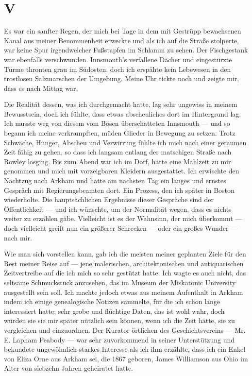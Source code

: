 \chapter*{V}

Es war ein sanfter Regen, der mich bei Tage in dem mit Gestrüpp bewachsenen Kanal aus meiner Benommenheit erweckte und als ich auf die Straße stolperte, war keine Spur irgendwelcher Fußstapfen im Schlamm zu sehen. Der Fischgestank war ebenfalls verschwunden. Innsmouth's verfallene Dächer und eingestürzte Türme thronten grau im Südosten, doch ich erspähte kein Lebewesen in den trostlosen Salzmarschen der Umgebung. Meine Uhr tickte noch und zeigte mir, dass es nach Mittag war.

Die Realität dessen, was ich durchgemacht hatte, lag sehr ungewiss in meinem Bewusstsein, doch ich fühlte, dass etwas abscheuliches dort im Hintergrund lag. Ich musste weg von diesem vom Bösen überschatteten Innsmouth --- und so begann ich meine verkrampften, müden Glieder in Bewegung zu setzen. Trotz Schwäche, Hunger, Abscheu und Verwirrung fühlte ich mich nach einer geraumen Zeit fähig zu gehen, so dass ich langsam entlang der matschigen Straße nach Rowley losging. Bis zum Abend war ich im Dorf, hatte eine Mahlzeit zu mir genommen und mich mit vorzeigbaren Kleidern ausgestattet. Ich erwischte den Nachtzug nach Arkham und hatte am nächsten Tag ein langes und ernstes Gespräch mit Regierungsbeamten dort. Ein Prozess, den ich später in Boston wiederholte. Die hauptsächlichen Ergebnisse dieser Gespräche sind der Öffentlichkeit --- und ich wünschte, um der Normalität wegen, dass es nichts weiter zu erzählen gäbe. Vielleicht ist es der Wahnsinn, der mich überkommt --- doch vielleicht greift nun ein größerer Schrecken --- oder ein großes Wunder --- nach mir.

Wie man sich vorstellen kann, gab ich die meisten meiner geplanten Ziele für den Rest meiner Reise auf --- jene malerischen, architektonischen und antiquarischen Zeitvertreibe auf die ich mich so sehr gestützt hatte. Ich wagte es auch nicht, das seltsame Schmuckstück anzusehen, das im Museum der Miskatonic University ausgestellt sein soll. Ich machte jedoch etwas aus meinem Aufenthalt in Arkham indem ich einige genealogische Notizen sammelte, für die ich schon lange interessiert hatte; sehr grobe und flüchtige Daten, das ist wohl wahr, doch würden sie sie mir später nützlich sein können, wenn ich die Zeit hätte, sie zu vergleichen und einzuordnen. Der Kurator örtlichen des Geschichtsvereins --- Mr. E. Lapham Peabody --- war sehr zuvorkommend in seiner Unterstützung und bekundete ungewöhnlich starkes Interesse als ich ihm erzählte, dass ich ein Enkel von Eliza Orne aus Arkham sei, die 1867 geboren, James Williamson aus Ohio im Alter von siebzehn Jahren geheiratet hatte.

